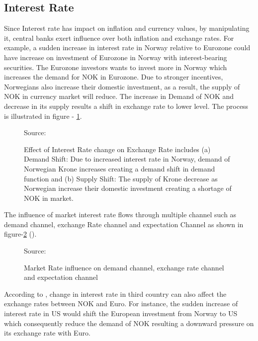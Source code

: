 \documentclass[12pt, lot, lof]{thesis}\usepackage[]{graphicx}\usepackage[]{color}
\begin{document}
\subsection{Interest Rate}
\label{ssec:interestRate}
Since Interest rate has impact on inflation and currency values, by manipulating it, central banks exert influence over both inflation and exchange rates. For example, a sudden increase in interest rate in Norway relative to Eurozone could have increase on investment of Eurozone in Norway with interest-bearing securities. The Eurozone investors wants to invest more in Norway which increases the demand for NOK in Eurozone. Due to stronger incentives, Norwegians also increase their domestic investment, as a result, the supply of NOK in currency market will reduce. The increase in Demand of NOK and decrease in its supply results a shift in exchange rate to lower level. The process is illustrated in figure - \ref{fig:intRateEffect}. 

\begin{figure}[ht]
\centering
    
    \flushright\scriptsize{Source: \cite{madura2012international}}
    \caption[Effect of interest rate change in Exchange Rate]{Effect of Interest Rate change on Exchange Rate includes (a) Demand Shift: Due to increased interest rate in Norway, demand of Norwegian Krone increases creating a demand shift in demand function and (b) Supply Shift: The supply of Krone decrease as Norwegian increase their domestic investment creating a shortage of NOK in market.}
    \label{fig:intRateEffect}
\end{figure}

The influence of market interest rate flows through multiple channel such as demand channel, exchange Rate channel and expectation Channel as shown in figure-\ref{fig:mrktRateInfluence} (\cite{intRateEffect:2004NB}).

\begin{figure}[ht]
    
    \flushright\scriptsize{Source: \cite{intRateEffect:2004NB}}
    \caption{Market Rate influence on demand channel, exchange rate channel and expectation channel}
    \label{fig:mrktRateInfluence}
\end{figure}


According to \citet{madura2012international}, change in interest rate in third country can also affect the exchange rates between NOK and Euro. For instance, the sudden increase of interest rate in US would shift the European investment from Norway to US which consequently reduce the demand of NOK resulting a downward pressure on its exchange rate with Euro.
\end{document}
